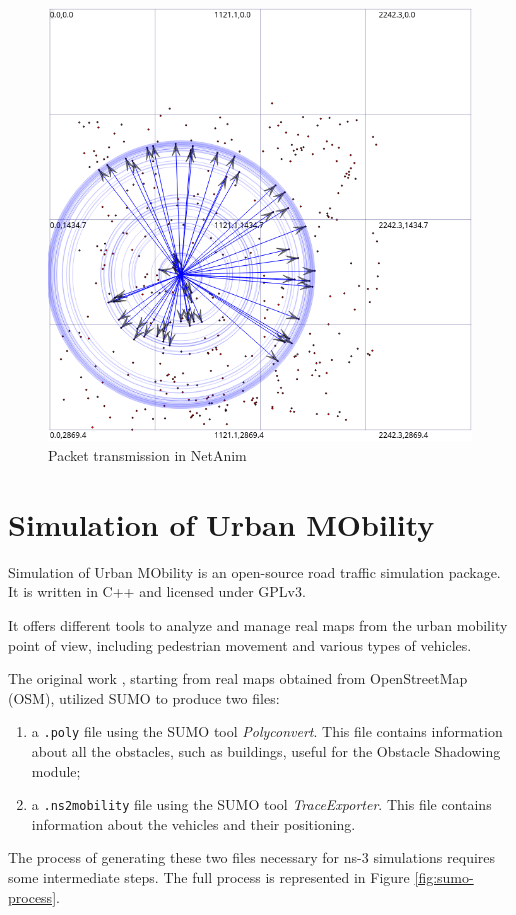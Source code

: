 			\begin{figure}[H]
				\centering
				\includegraphics[scale=0.38]{immagini/netanim}
				\caption{Packet transmission in NetAnim}
				\label{fig:netanim}
			\end{figure}
	
	\section{Simulation of Urban MObility}
		\label{sec:sumo}
		Simulation of Urban MObility is an open-source road traffic simulation package. It is written in C++ and licensed under GPLv3. 
		
		
		It offers different tools to analyze and manage real maps from the urban mobility point of view, including pedestrian movement and various types of vehicles.
		
		
		The original work \cite{ROM2017} , starting from real maps obtained from OpenStreetMap (OSM), utilized SUMO to produce two files:
		\begin{enumerate}
			\item a \texttt{.poly} file using the SUMO tool \textit{Polyconvert}. This file contains information about all the obstacles, such as buildings, useful for the Obstacle Shadowing module;
			\item a \texttt{.ns2mobility} file using the SUMO tool \textit{TraceExporter}. This file contains information about the vehicles and their positioning. 
		\end{enumerate}
		The process of generating these two files necessary for ns-3 simulations requires some intermediate steps. The full process is represented in Figure \ref{fig:sumo-process}. 
		
